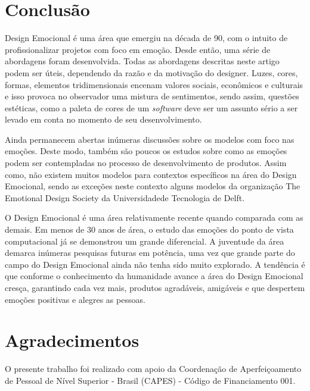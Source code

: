 \documentclass[12pt]{article}
\begin{document}
\section{Conclusão}\label{secao:conclusao}

Design Emocional é uma área que emergiu na década de 90, com o intuito de profissionalizar projetos com foco em emoção. Desde então, uma série de abordagens foram desenvolvida. Todas as abordagens descritas neste artigo podem ser úteis, dependendo da razão e da motivação do designer. Luzes, cores, formas, elementos tridimensionais encenam valores sociais, econômicos e culturais e isso provoca no observador uma mistura de sentimentos, sendo assim, questões estéticas, como a paleta de cores de um \textit{software} deve ser um assunto sério a ser levado em conta no momento de seu desenvolvimento. 

Ainda permanecem abertas inúmeras discussões sobre os modelos com foco nas emoções. Deste modo, também são poucos os estudos sobre como as emoções podem ser contempladas no processo de desenvolvimento de produtos. Assim como, não existem muitos modelos para contextos específicos na área do Design Emocional, sendo as exceções neste contexto alguns modelos da organização The Emotional Design Society da Universidadede Tecnologia de Delft.

O Design Emocional é uma área relativamente recente quando comparada com as demais. Em menos de 30 anos de área, o estudo das emoções do ponto de vista computacional já se demonstrou um grande diferencial. A juventude da área demarca inúmeras pesquisas futuras em potência, uma vez que grande parte do campo do Design Emocional ainda não tenha sido muito explorado. A tendência é que conforme o conhecimento da humanidade avance a área do Design Emocional cresça, garantindo cada vez mais, produtos agradáveis, amigáveis e que despertem emoções positivas e alegres as pessoas. 


\section*{Agradecimentos}\label{secao:agradecimentos}

O presente trabalho foi realizado com apoio da Coordenação de Aperfeiçoamento de Pessoal de Nível Superior - Brasil (CAPES) - Código de Financiamento 001.

%

\end{document}
